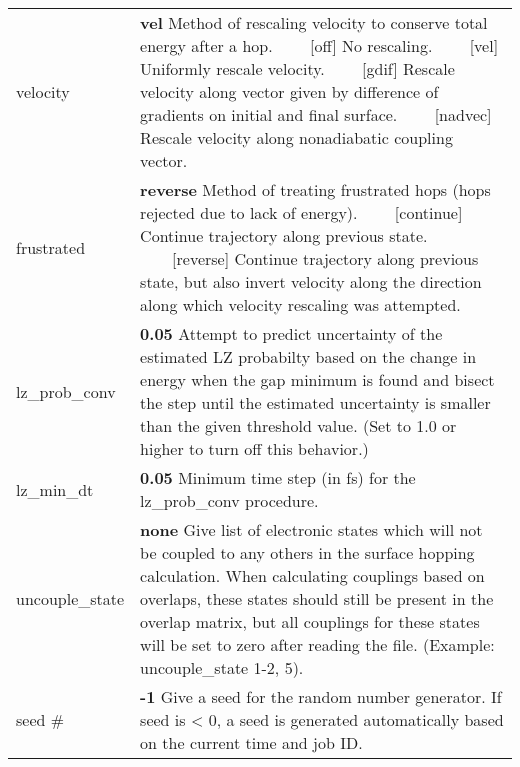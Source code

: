 \documentclass{report}
\newcommand{\tabitem}{~~\llap{--}~~}
\begin{document}
\begin{tabularx}{\textwidth}{ m{2.5cm} X }
velocity		&
	\textbf{vel} \newline
	Method of rescaling velocity to conserve total energy after a hop. \newline
	\tabitem [off] No rescaling. \newline
	\tabitem [vel] Uniformly rescale velocity. \newline
	\tabitem [gdif] Rescale velocity along vector given by difference of gradients on initial and final surface. \newline
	\tabitem [nadvec] Rescale velocity along nonadiabatic coupling vector. \\

frustrated		&
	\textbf{reverse} \newline
	Method of treating frustrated hops (hops rejected due to lack of energy). \newline
	\tabitem [continue] Continue trajectory along previous state. \newline
	\tabitem [reverse] Continue trajectory along previous state, but also invert velocity along the direction along which velocity rescaling was attempted. \\

lz\_prob\_conv	&
	\textbf{0.05} \newline
	Attempt to predict uncertainty of the estimated LZ probabilty based on the change in energy when the gap minimum is found and bisect the step until the estimated uncertainty is smaller than the given threshold value. (Set to 1.0 or higher to turn off this behavior.) \\

lz\_min\_dt	&
	\textbf{0.05} \newline
    Minimum time step (in fs) for the lz\_prob\_conv procedure. \\

uncouple\_state		&
	\textbf{none} \newline
	Give list of electronic states which will not be coupled to any others in the surface hopping calculation. When calculating couplings based on overlaps, these states should still be present in the overlap matrix, but all couplings for these states will be set to zero after reading the file. (Example: uncouple\_state 1-2, 5). \\
	
seed \# 		&
	\textbf{-1} \newline
	Give a seed for the random number generator. If seed is < 0, a seed is generated automatically based on the current time and job ID. \\
\end{tabularx}
\end{document}
